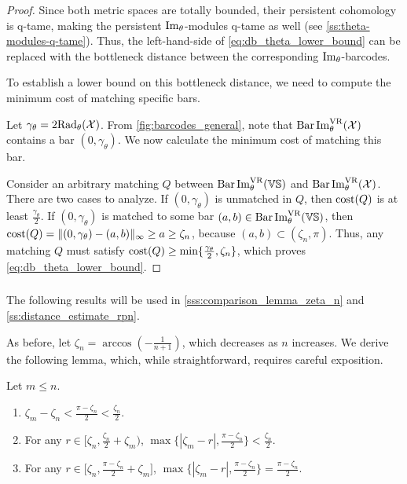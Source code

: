 \begin{proof}
    Since both metric spaces are totally bounded, their persistent cohomology is q-tame, making the persistent $\operatorname{Im}_\theta$-modules q-tame as well (see \cref{ss:theta-modules-q-tame}).
    Thus, the left-hand-side of \cref{eq:db_theta_lower_bound} can be replaced with the bottleneck distance between the corresponding $\operatorname{Im}_\theta$-barcodes.

    To establish a lower bound on this bottleneck distance, we need to compute the minimum cost of matching specific bars.

    Let \( \gamma_\theta = 2\mathrm{Rad}_{\theta}(\mathcal{X}) \).
    From \cref{fig:barcodes_general}, note that \( \operatorname{Bar}\operatorname{Im}_{\theta}^{\mathrm{VR}} (\mathcal{X}) \) contains a bar \( (0, \gamma_\theta) \).
    We now calculate the minimum cost of matching this bar.

    Consider an arbitrary matching \( Q \) between \( \operatorname{Bar}\operatorname{Im}_{\theta}^{\mathrm{VR}} (\mathbb{VS}) \) and \( \operatorname{Bar}\operatorname{Im}_{\theta}^{\mathrm{VR}} (\mathcal{X}) \).
    There are two cases to analyze.
	If $(0,\gamma_\theta )$ is unmatched in $Q$, then $\mathrm{cost}(Q)$ is at least $ \tfrac{\gamma_\theta }{2}$.
	If $(0,\gamma_\theta )$ is matched to some bar $(a,b) \in \operatorname{Bar}\operatorname{Im}_{\theta}^{\mathrm{VR}} (\mathbb{VS})$, then
	$\mathrm{cost}(Q) =  \|(0,\gamma_\theta ) - (a,b)\|_\infty \geq a \geq \zeta_n$, because $(a,b) \subset (\zeta_n, \pi)$.
	Thus, any matching $Q$ must satisfy $\mathrm{cost}(Q) \geq \min\{\tfrac{\gamma_\theta }{2}, \zeta_n\}$, which proves \cref{eq:db_theta_lower_bound}.
\end{proof}


\subsubsection{}
\label{sss:comparison_lemma}

The following results will be used in \cref{sss:comparison_lemma_zeta_n} and \cref{ss:distance_estimate_rpn}.

As before, let $\zeta_n = \arccos{(-\tfrac{1}{n+1})}$, which decreases as $n$ increases.
We derive the following lemma, which, while straightforward, requires careful exposition.

\medskip\lemma
Let $m \leq n$.
\begin{enumerate}
    \item \(\zeta_m - \zeta_n < \tfrac{\pi - \zeta_n}{2} < \tfrac{\zeta_n}{2}.\)

    \item For any $r \in \big[\zeta_n, \tfrac{\zeta_n}{2}+\zeta_m\big)$, $\max\big\{|\zeta_m  - r |, \tfrac{\pi - \zeta_n}{2}\big\} < \tfrac{\zeta_n}{2}$.

    \item For any $r \in \big[\zeta_n, \tfrac{\pi - \zeta_n}{2} + \zeta_m\big]$, $\max\{|\zeta_m  - r |, \tfrac{\pi - \zeta_n}{2}\} = \tfrac{\pi - \zeta_n}{2}$.
\end{enumerate}


